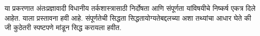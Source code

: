 \documentclass[../../../include/open-logic-chapter]{subfiles}
\begin{document}

\begin{editorial}
  या प्रकरणात अंतःप्रज्ञावादी विधानीय तर्कशास्त्रासाठी
  निर्दोषता आणि संपूर्णता यांविषयीचे निष्कर्ष
  एकत्र दिले आहेत. याला प्रस्तावना हवी आहे.
  संपूर्णतेची सिद्धता सिद्धतायोग्यतेबद्दलच्या
  अशा तथ्यांचा आधार घेते की जी कुठेतरी
  स्पष्टपणे मांडून सिद्ध करायला हवीत.
\end{editorial}


\OLEndChapterHook
\end{document}
